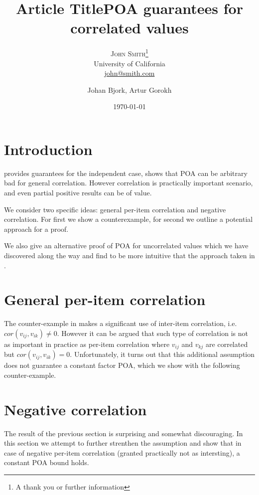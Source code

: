 \documentclass[twoside,onecolumn]{article}
\title{Article Title} %
\author{%
\textsc{John Smith}\thanks{A thank you or further information} \\[1ex] %
\normalsize University of California \\ %
\normalsize \href{mailto:john@smith.com}{john@smith.com} %
}
\date{\today} %
\author{Johan Bjork, Artur Gorokh}
\begin{document}
\title{POA guarantees for correlated values
}
\maketitle
\section{Introduction}

\cite{survey} provides guarantees for the independent case, \cite{roughgarden} shows that POA can be arbitrary bad for general correlation. However correlation is practically important scenario, and even partial positive results can be of value.  

We consider two specific ideas: general per-item correlation and negative correlation. For first we show a counterexample, for second we outline a potential approach for a proof.

We also give an alternative proof of POA for uncorrelated values which we have discovered along the way and find to be more intuitive that the approach taken in \cite{survey}.

\section{General per-item correlation}

The counter-example in \cite{roughgarden} makes a significant use of inter-item correlation, i.e. $cor(v_{ij},v_{ik})\neq 0$. However it can be argued that such type of correlation is not as important in practice as per-item correlation where $v_{ij}$ and $v_{kj}$ are correlated but $cor(v_{ij},v_{ik}) = 0$. Unfortunately, it turns out that this additional assumption does not guarantee a constant factor POA, which we show with the following counter-example.

\section{Negative correlation}
The result of the previous section is surprising and somewhat discouraging. In this section we attempt to further strenthen the assumption and show that in case of negative per-item correlation (granted practically not as intersting), a constant POA bound holds. 
\end{document}
